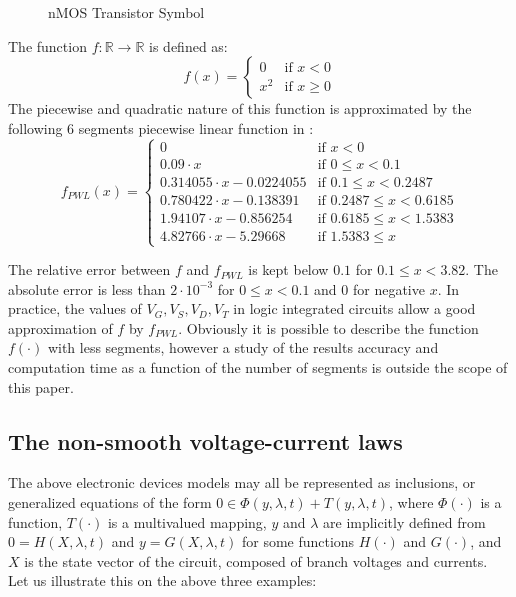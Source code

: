 \documentclass{article}
\def\geq{\geqslant}
\def\leq{\leqslant}
\begin{document}
\begin{figure}
  \centering
  
  \caption{nMOS Transistor Symbol}
  \label{fig:NMOS}
\end{figure}


The function $f :\mathbb{R} \longrightarrow \mathbb{R}$ is defined as:
\[
f(x) = \left\{ \begin{array}{ll}
0 & \textrm{if $x < 0$}\\
x^2 & \textrm{if $x \geq 0$}
\end{array} \right.
\]
The piecewise and quadratic nature of this function is approximated by the following 6 segments piecewise linear
function in \cite{leenaerts-bokhoven1998}: 
\[
f_{PWL}(x) = \left\{ \begin{array}{ll}
0                            & \textrm{if $x < 0$}\\
0.09 \cdot x                 & \textrm{if $0 \leq x < 0.1$}\\
0.314055 \cdot x - 0.0224055 & \textrm{if $0.1 \leq x < 0.2487$}\\
0.780422 \cdot x - 0.138391  & \textrm{if $0.2487 \leq x < 0.6185$}\\
1.94107 \cdot x  - 0.856254  & \textrm{if $0.6185 \leq x < 1.5383$}\\
4.82766 \cdot x - 5.29668    & \textrm{if $1.5383 \leq x $}
\end{array} \right.
\]

The relative error between $f$ and $f_{PWL}$ is kept below $0.1$ for $0.1 \leq x < 3.82$. The absolute error is less than $2 \cdot 10^{-3}$ for $0 \leq x < 0.1$ and $0$ for negative $x$. In practice, the values of $V_G,V_S,V_D,V_T$ in logic integrated circuits allow  a good approximation of $f$ by $f_{PWL}$. Obviously it is possible to describe the function $f(\cdot)$ with less segments, however a study of the results accuracy and computation time as a function of the number of segments is outside the scope of this paper. 


\subsection{The non-smooth voltage-current laws} 


The above electronic devices models may all be represented as inclusions, or generalized equations of the form $0 \in \Phi(y,\lambda,t) + T(y,\lambda,t)$, where $\Phi(\cdot)$ is a function, $T(\cdot)$ is a multivalued mapping, $y$ and $\lambda$ are implicitly defined from $0=H(X,\lambda,t)$ and $y=G(X,\lambda,t)$ for some functions $H(\cdot)$ and $G(\cdot)$, and $X$ is the state vector of the circuit, composed of branch voltages and currents. Let us illustrate this on the above three examples: 
\end{document}
